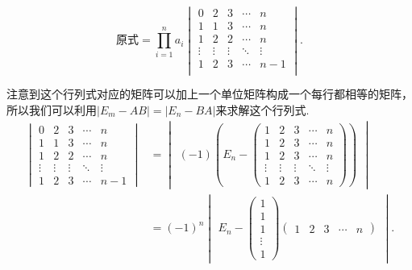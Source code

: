 \documentclass[UTF8,12pt,a4paper,fontset=fandol]{ctexart}
\begin{document}
\begin{solve}
\[ \text{原式}=\prod_{i=1}^na_i \begin{vmatrix}
                0      & 2      & 3      & \cdots & n      \\
                1      & 1      & 3      & \cdots & n      \\
                1      & 2      & 2      & \cdots & n      \\
                \vdots & \vdots & \vdots & \ddots & \vdots \\
                1      & 2      & 3      & \cdots & n-1    \\
            \end{vmatrix}. \]

            注意到这个行列式对应的矩阵可以加上一个单位矩阵构成一个每行都相等的矩阵，所以我们可以利用$|E_m-AB|=|E_n-BA|$来求解这个行列式.
            \begin{align*}
                \begin{vmatrix}
                    0      & 2      & 3      & \cdots & n      \\
                    1      & 1      & 3      & \cdots & n      \\
                    1      & 2      & 2      & \cdots & n      \\
                    \vdots & \vdots & \vdots & \ddots & \vdots \\
                    1      & 2      & 3      & \cdots & n-1
                \end{vmatrix}
                & = \begin{vmatrix}(-1)\left(E_n-\begin{pmatrix}
                        1      & 2      & 3      & \cdots & n      \\
                        1      & 2      & 3      & \cdots & n      \\
                        1      & 2      & 3      & \cdots & n      \\
                        \vdots & \vdots & \vdots & \ddots & \vdots \\
                        1      & 2      & 3      & \cdots & n
                    \end{pmatrix}\right)\end{vmatrix} \\
                & =(-1)^n\begin{vmatrix}E_n-
                            \begin{pmatrix}
                        1 \\1\\1\\\vdots\\1
                    \end{pmatrix}\begin{pmatrix}1 & 2 & 3 & \cdots & n\end{pmatrix}\end{vmatrix}.
            \end{align*}


\end{solve}
\end{document}
